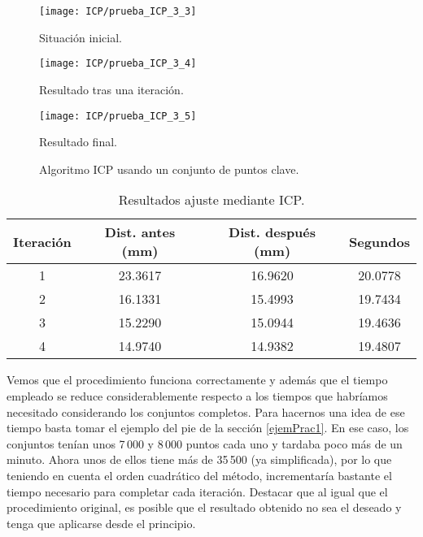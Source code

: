 \begin{figure}[h!]
	\begin{minipage}[b]{0.5\textwidth}
		\centering
		\texttt{[image: ICP/prueba\_ICP\_3\_3]} 
		\caption*{Situación inicial.}
	\end{minipage}
	\begin{minipage}[b]{0.5\textwidth}
		\centering
		\texttt{[image: ICP/prueba\_ICP\_3\_4]}
		\caption*{Resultado tras una iteración.}
	\end{minipage}
	\begin{center}
		\begin{minipage}[b]{0.5\textwidth}
		\centering
		\texttt{[image: ICP/prueba\_ICP\_3\_5]}
		\caption*{Resultado final.}
	\end{minipage}
	\end{center}

	\caption{Algoritmo ICP usando un conjunto de puntos clave.}
	\label{clave1}
\end{figure}

\begin{table}[h!]
	\centering
	\begin{tabular}{| c | c | c | c |} 
		\hline
		Iteración & Dist. antes (mm)  & Dist. después (mm) & Segundos \\
		\hline
		1 &  23.3617 &  16.9620 & 20.0778\\			 
		2 & 16.1331 & 15.4993 &   19.7434\\	
		3 & 15.2290 & 15.0944  & 19.4636\\
		4 & 14.9740 &  14.9382 & 19.4807\\
		\hline
	\end{tabular}
	\caption{Resultados ajuste mediante ICP.}
	\label{table:ICPKPtotal}
\end{table}

Vemos que el procedimiento funciona correctamente y además que el tiempo empleado se reduce considerablemente respecto a los tiempos que habríamos necesitado considerando los conjuntos completos. Para hacernos una idea de ese tiempo basta tomar el ejemplo del pie de la sección \ref{ejemPrac1}. En ese caso, los conjuntos tenían unos 7\,000 y 8\,000 puntos cada uno y tardaba poco más de un minuto. Ahora unos de ellos tiene más de 35\,500 (ya simplificada), por lo que teniendo en cuenta el orden cuadrático del método, incrementaría bastante el tiempo necesario para completar cada iteración. Destacar que al igual que el procedimiento original, es posible que el resultado obtenido no sea el deseado y tenga que aplicarse desde el principio.
